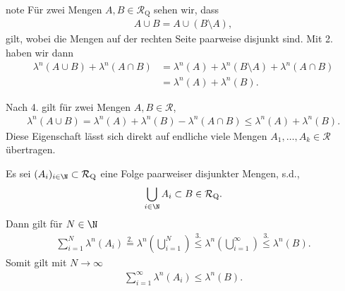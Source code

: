 \documentclass[letterpaper,10pt,english]{jupyterBook}
\begin{document}
\begin{sphinxadmonition}{note}
\sphinxAtStartPar
Für zwei Mengen \(A,B\in\mathcal{R}_{\text{Q}}\) sehen wir, dass
\begin{equation*}
\begin{split}A\cup B = A \cup (B\setminus A),\end{split}
\end{equation*}
\sphinxAtStartPar
gilt, wobei die Mengen auf der rechten Seite paarweise disjunkt sind. Mit 2. haben wir dann
\begin{equation*}
\begin{split}\lambda^n(A\cup B) + \lambda^n(A\cap B)
&= \lambda^n(A) + \lambda^n(B\setminus A) + \lambda^n(A\cap B)
\\&= 
\lambda^n(A) + \lambda^n(B).\end{split}
\end{equation*}
\sphinxAtStartPar
{}

\sphinxAtStartPar
Nach 4. gilt für zwei Mengen \(A,B\in\mathcal{R}\),
\begin{equation*}
\begin{split}\lambda^n(A\cup B) = \lambda^n(A) + \lambda^n(B) - \lambda^n(A\cap B) \leq \lambda^n(A) + \lambda^n(B).\end{split}
\end{equation*}
\sphinxAtStartPar
Diese Eigenschaft lässt sich direkt auf endliche viele Mengen \(A_1,\ldots,A_k\in\mathcal{R}\) übertragen.

\sphinxAtStartPar
{}

\sphinxAtStartPar
Es sei \((A_i)_{i\in\N}\subset \mathcal{R}_{\text{Q}}\) eine Folge paarweiser disjunkter Mengen, s.d.,
\begin{equation*}
\begin{split}\bigcup_{i\in\N} A_i\subset B\in \mathcal{R}_{\text{Q}}.\end{split}
\end{equation*}
\sphinxAtStartPar
Dann gilt für \(N\in\N\)
\begin{equation*}
\begin{split}\sum_{i=1}^N \lambda^n(A_i) 
\overset{2.}{=} \lambda^n\left(\bigcup_{i=1}^N\right) 
\overset{3.}{\leq} \lambda^n\left(\bigcup_{i=1}^\infty\right)
\overset{3.}{\leq} \lambda^n(B).\end{split}
\end{equation*}
\sphinxAtStartPar
Somit gilt mit \(N\to\infty\)
\begin{equation*}
\begin{split}\sum_{i=1}^\infty \lambda^n(A_i) \leq \lambda^n(B).\end{split}
\end{equation*}\end{sphinxadmonition}
\end{document}
